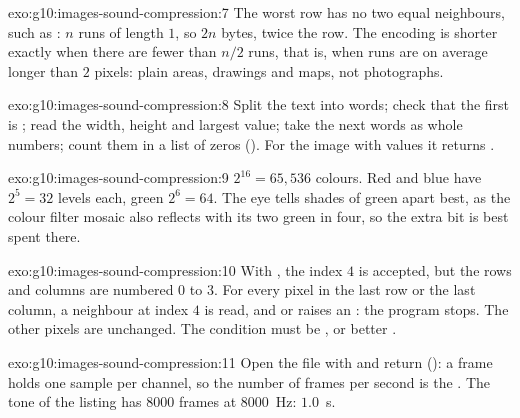 \begin{solution}{exo:g10:images-sound-compression:7}
The worst row has no two equal neighbours, such as : $n$ runs of length $1$, so $2n$ bytes, twice the
row. The encoding is shorter exactly when there are fewer than $n/2$ runs, that is, when runs are on average longer
than $2$ pixels: plain areas, drawings and maps, not photographs.
\end{solution}

\begin{solution}{exo:g10:images-sound-compression:8}
Split the text into words; check that the first is ; read the width, height and largest value; take the
next  words as whole numbers; count them in a list of  zeros
(). For the image  with values  it returns
\code{[1, 2, 0, 0, 3]}.
\end{solution}

\begin{solution}{exo:g10:images-sound-compression:9}
$2^{16} = 65{,}536$ colours. Red and blue have $2^5 = 32$ levels each, green $2^6 = 64$. The eye tells shades of green
apart best, as the colour filter mosaic also reflects with its two green  in four, so the extra bit is best
spent there.
\end{solution}

\begin{solution}{exo:g10:images-sound-compression:10}
With , the index $4$ is accepted, but the rows and columns are numbered $0$ to $3$. For every pixel in the
last row or the last column, a neighbour at index $4$ is read, and  or  raises an
: the program stops. The other pixels are unchanged. The condition must be , or better
.
\end{solution}

\begin{solution}{exo:g10:images-sound-compression:11}
Open the file with  and return 
(): a frame holds one sample per channel, so the number of frames per second is the
. The tone of the listing has $8000$ frames at $8000$~Hz: $1.0$~s.
\end{solution}

